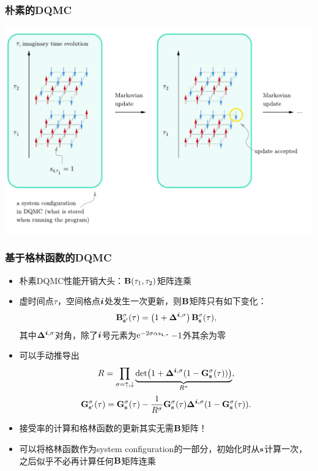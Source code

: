 \documentclass[UTF8]{ctexbeamer}
\DeclareMathOperator{\ee}{e}
\begin{document}
\begin{frame}
\frametitle{朴素的DQMC}

\begin{center}
    \includegraphics[width=\textwidth]{naive-dqmc.pdf}
\end{center}

\end{frame}

\begin{frame}
\frametitle{基于格林函数的DQMC}

\begin{itemize}
    \item 朴素DQMC性能开销大头：$\vb{B}(\tau_1, \tau_2)$矩阵连乘
    \item 虚时间点$\tau$，空间格点$\vb*{i}$处发生一次更新，则$\vb{B}$矩阵只有如下变化：
    \begin{equation}
        \mathbf{B}^\sigma_{\mathbf{s}^{\prime}}(\tau)=\left(1+\vb{\Delta}^{\vb*{i}, \sigma}\right) \mathbf{B}^\sigma_{\mathbf{s}}(\tau),
    \end{equation}
    其中$\vb{\Delta}^{\vb*{i}, \sigma}$对角，除了$\vb*{i}$号元素为$\ee^{-2 \sigma \alpha s_{\vb*{i}, \tau}} - 1$外其余为零
    \item 可以手动推导出
    \begin{equation}
        R = \prod_{\sigma = \uparrow, \downarrow} \underbrace{\det(1 + \vb{\Delta}^{\vb*{i}, \sigma} (1 - \vb{G}^\sigma_{\vb{s}}(\tau)))}_{R^\sigma},
        \label{eq:accept-rate}
    \end{equation}   
    \begin{equation}
        \vb{G}^\sigma_{\vb{s}'}(\tau) = \vb{G}^\sigma_{\vb{s}}(\tau) - \frac{1}{R^\sigma} \vb{G}^\sigma_{\vb{s}}(\tau) \vb{\Delta}^{\vb*{i}, \sigma} (1 - \vb{G}^\sigma_{\vb{s}}(\tau)).
        \label{eq:green-function-update}
    \end{equation}
    \item 接受率的计算和格林函数的更新其实无需$\vb{B}$矩阵！
    \item 可以将格林函数作为system configuration的一部分，初始化时从$\vb{s}$计算一次，之后似乎不必再计算任何$\vb{B}$矩阵连乘
\end{itemize}

\end{frame}
\end{document}
